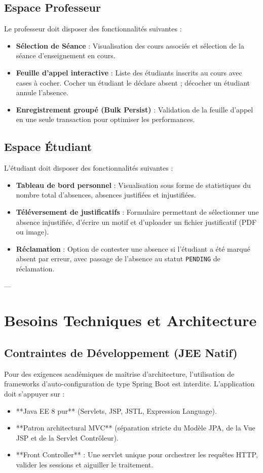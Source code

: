 \documentclass[12pt,a4paper]{article}
\begin{document}
\subsection{Espace Professeur}
Le professeur doit disposer des fonctionnalités suivantes :
\begin{itemize}
    \item \textbf{Sélection de Séance} : Visualisation des cours associés et sélection de la séance d'enseignement en cours.
    \item \textbf{Feuille d'appel interactive} : Liste des étudiants inscrits au cours avec cases à cocher. Cocher un étudiant le déclare absent ; décocher un étudiant annule l'absence.
    \item \textbf{Enregistrement groupé (Bulk Persist)} : Validation de la feuille d'appel en une seule transaction pour optimiser les performances.
\end{itemize}

\subsection{Espace Étudiant}
L'étudiant doit disposer des fonctionnalités suivantes :
\begin{itemize}
    \item \textbf{Tableau de bord personnel} : Visualisation sous forme de statistiques du nombre total d'absences, absences justifiées et injustifiées.
    \item \textbf{Téléversement de justificatifs} : Formulaire permettant de sélectionner une absence injustifiée, d'écrire un motif et d'uploader un fichier justificatif (PDF ou image).
    \item \textbf{Réclamation} : Option de contester une absence si l'étudiant a été marqué absent par erreur, avec passage de l'absence au statut \texttt{PENDING} de réclamation.
\end{itemize}

---

\section{Besoins Techniques et Architecture}

\subsection{Contraintes de Développement (JEE Natif)}
Pour des exigences académiques de maîtrise d'architecture, l'utilisation de frameworks d'auto-configuration de type Spring Boot est interdite. L'application doit s'appuyer sur :
\begin{itemize}
    \item **Java EE 8 pur** (Servlets, JSP, JSTL, Expression Language).
    \item **Patron architectural MVC** (séparation stricte du Modèle JPA, de la Vue JSP et de la Servlet Contrôleur).
    \item **Front Controller** : Une servlet unique pour orchestrer les requêtes HTTP, valider les sessions et aiguiller le traitement.
\end{itemize}
\end{document}
